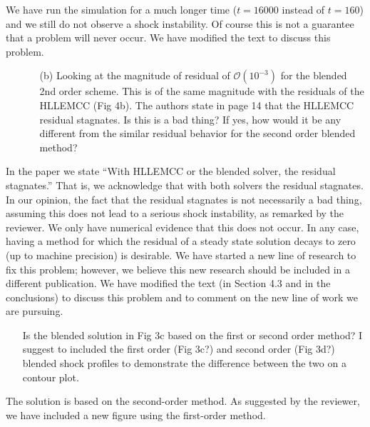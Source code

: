 \documentclass[english,11pt]{article}
\begin{document}
We have run the simulation for a much longer time ($t=16000$ instead of $t=160$) and we still do not 
observe a shock instability. Of course this is not a guarantee that a problem will never occur. 
We have modified the text to discuss this problem. 

{\color{OliveGreen}
  \begin{itemize}
    \item[]
    \begin{itemize}
      \item[(b)]
        Looking at the magnitude of residual of $\mathcal{O}(10^{-3})$ for the blended 
        2nd order scheme. This is of the same magnitude with the residuals of the HLLEMCC 
        (Fig 4b). The authors state in page 14 that the HLLEMCC residual stagnates. 
        Is this is a bad thing? If yes, how would it be any different from the similar 
        residual behavior for the second order blended method?
    \end{itemize}
  \end{itemize}
}
\noindent
In the paper we state ``With HLLEMCC or the blended solver, the residual stagnates.'' That is, 
we acknowledge that with both solvers the residual stagnates. In our opinion, the fact that the 
residual stagnates is not necessarily a bad thing, assuming this does not lead to a 
serious shock instability, as remarked by the reviewer. We only have numerical evidence that 
this does not occur. In any case, having a method for which the residual of a steady state solution 
decays to zero (up to machine precision) is desirable. We have started a new line of research to 
fix this problem; however, we believe this new research should be included in a different publication. 
We have modified the text (in Section 4.3 and in the conclusions) to discuss this problem and 
to comment on the new line of work we are pursuing.

{\color{OliveGreen}
  \begin{itemize}
    \item[]
    \begin{itemize}
      Is the blended solution in Fig 3c based on the first or second order method? 
      I suggest to included the first order (Fig 3c?) and second order (Fig 3d?) 
      blended shock profiles to demonstrate the difference between the two on a contour plot.
    \end{itemize}
  \end{itemize}
}
\noindent
The solution is based on the second-order method. As suggested by the reviewer, we have included 
a new figure using the first-order method. 



\end{document}
